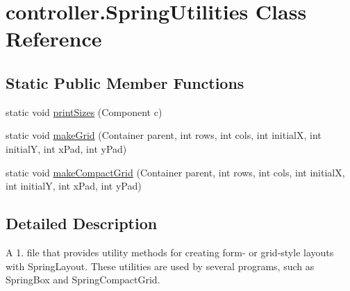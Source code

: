 \hypertarget{classcontroller_1_1_spring_utilities}{\section{controller.\-Spring\-Utilities Class Reference}
\label{classcontroller_1_1_spring_utilities}
}
\subsection*{Static Public Member Functions}
\begin{DoxyCompactItemize}
\item 
static void \hyperlink{classcontroller_1_1_spring_utilities_ab25bdda847d4fe39c5d63cc96c085780}{print\-Sizes} (Component c)
\item 
static void \hyperlink{classcontroller_1_1_spring_utilities_aeeff2319a4cfb70260cf61218c17546c}{make\-Grid} (Container parent, int rows, int cols, int initial\-X, int initial\-Y, int x\-Pad, int y\-Pad)
\item 
static void \hyperlink{classcontroller_1_1_spring_utilities_a151ce024b64cd12c25ef15bb200236be}{make\-Compact\-Grid} (Container parent, int rows, int cols, int initial\-X, int initial\-Y, int x\-Pad, int y\-Pad)
\end{DoxyCompactItemize}


\subsection{Detailed Description}
A 1. file that provides utility methods for creating form-\/ or grid-\/style layouts with Spring\-Layout. These utilities are used by several programs, such as Spring\-Box and Spring\-Compact\-Grid. 

